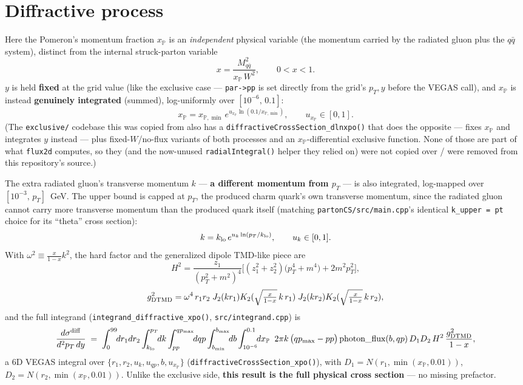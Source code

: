 \documentclass[11pt]{article}
\begin{document}
\section{Diffractive process}
\label{sec:diffractive}

Here the Pomeron's momentum fraction $x_{\mathbb P}$ is an
\emph{independent} physical variable (the momentum carried by the radiated
gluon plus the $q\bar q$ system), distinct from the internal struck-parton
variable
\[
x = \frac{M_{q\bar q}^2}{x_{\mathbb P}\,W^2}, \qquad 0<x<1.
\]
$y$ is held \textbf{fixed} at the grid value (like the exclusive case —
\texttt{par->pp} is set directly from the grid's $p_T,y$ before the VEGAS
call), and $x_{\mathbb P}$ is instead \textbf{genuinely integrated}
(summed), log-uniformly over $[10^{-6},\,0.1]$:
\[
x_{\mathbb P} = x_{\mathbb P,\min}\,e^{u_{x_{\mathbb P}}\ln(0.1/x_{\mathbb P,\min})},
\qquad u_{x_{\mathbb P}}\in[0,1].
\]
(The \texttt{exclusive/} codebase this was copied from also has a
\texttt{diffractiveCrossSection\_dlnxpo()} that does the opposite — fixes
$x_{\mathbb P}$ and integrates $y$ instead — plus fixed-$W$/no-flux
variants of both processes and an $x_{\mathbb P}$-differential exclusive
function. None of those are part of what \texttt{flux2d} computes, so
they (and the now-unused \texttt{radialIntegral()} helper they relied on)
were not copied over / were removed from this repository's source.)

The extra radiated gluon's transverse momentum $k$ — \textbf{a different
momentum from $p_T$} — is also integrated, log-mapped over
$[10^{-3},\,p_T]$~GeV. The upper bound is capped at $p_T$, the produced
charm quark's own transverse momentum, since the radiated gluon cannot
carry more transverse momentum than the produced quark itself (matching
\texttt{partonCS/src/main.cpp}'s identical \texttt{k\_upper = pt} choice
for its ``theta'' cross section):
\[
k = k_{\rm lo}\,e^{u_k\ln(p_T/k_{\rm lo})}, \qquad u_k\in[0,1].
\]
With $\omega^2 \equiv \frac{x}{1-x}k^2$, the hard factor and the
generalized dipole TMD-like piece are
\[
H^2 = \frac{z_1}{(p_T^2+m^2)^4}\Big[(z_1^2+z_2^2)\big(p_T^4+m^4\big)
+ 2m^2p_T^2\Big],
\]
\[
g_{\rm DTMD}^2 = \omega^4\,r_1 r_2\;
J_2(kr_1)K_2(\sqrt{\tfrac{x}{1-x}}\,k\,r_1)\;
J_2(kr_2)K_2(\sqrt{\tfrac{x}{1-x}}\,k\,r_2),
\]
and the full integrand (\texttt{integrand\_diffractive\_xpo()},
\texttt{src/integrand.cpp}) is
\[
\frac{d\sigma^{\rm diff}}{d^2p_T\,dy} \;=\;
\int_0^{99}\!\!dr_1 dr_2\int_{k_{\rm lo}}^{p_T}\!\!dk
\int_{pp}^{qp_{\max}}\!\!dqp \int_{b_{\min}}^{b_{\max}}\!\!db
\int_{10^{-6}}^{0.1}\!\!dx_{\mathbb P}\;\;
2\pi k\,\big(qp_{\max}-pp\big)\,\text{photon\_flux}(b,qp)\,
D_1D_2\,H^2\,\frac{g_{\rm DTMD}^2}{1-x},
\]
a 6D VEGAS integral over $\{r_1,r_2,u_k,u_{qp},b,u_{x_{\mathbb P}}\}$
(\texttt{diffractiveCrossSection\_xpo()}), with $D_1=N(r_1,\min(x_{\mathbb
P},0.01))$, $D_2=N(r_2,\min(x_{\mathbb P},0.01))$. Unlike the exclusive
side, \textbf{this result is the full physical cross section} — no
missing prefactor.
\end{document}
